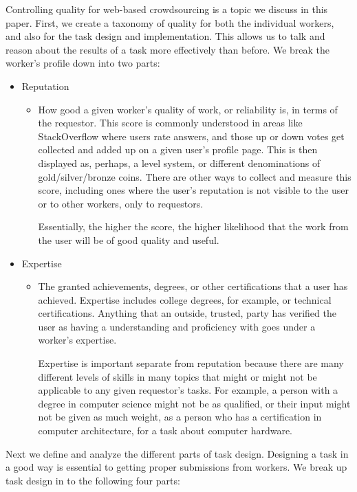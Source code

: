 \documentclass{sig-alternate-05-2015}
\begin{document}
	Controlling quality for web-based crowdsourcing is a topic we discuss in this paper. First, we create a taxonomy of quality for both the individual workers, and also for the task design and implementation. This allows us to talk and reason about the results of a task more effectively than before. We break the worker's profile down into two parts:
	\begin{itemize}
		\item Reputation
		\begin{itemize}
			\item How good a given worker's quality of work, or reliability is, in terms of the requestor. This score is commonly understood in areas like StackOverflow where users rate answers, and those up or down votes get collected and added up on a given user's profile page. This is then displayed as, perhaps, a level system, or different denominations of gold/silver/bronze coins. There are other ways to collect and measure this score, including ones where the user's reputation is not visible to the user or to other workers, only to requestors. 
			
			Essentially, the higher the score, the higher likelihood that the work from the user will be of good quality and useful.
		\end{itemize}
		\item Expertise
		\begin{itemize}
			\item The granted achievements, degrees, or other certifications that a user has achieved. Expertise includes college degrees, for example, or technical certifications. Anything that an outside, trusted, party has verified the user as having a understanding and proficiency with goes under a worker's expertise. 
			
			Expertise is important separate from reputation because there are many different levels of skills in many topics that might or might not be applicable to any given requestor's tasks. For example, a person with a degree in computer science might not be as qualified, or their input might not be given as much weight, as a person who has a certification in computer architecture, for a task about computer hardware. 
		\end{itemize}
	\end{itemize}
	
	Next we define and analyze the different parts of task design. Designing a task in a good way is essential to getting proper submissions from workers. We break up task design in to the following four parts:
	
\end{document}

